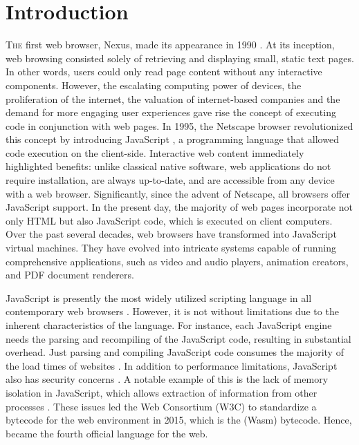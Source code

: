 
\chapter{Introduction}
\label{Intro}


\lettrine[lines=3]{T}{he} first web browser, Nexus, made its appearance in 1990 \cite{nexus}.  
At its inception, web browsing consisted solely of retrieving and displaying small, static text pages. 
In other words, users could only read page content without any interactive components. 
However, the escalating computing power of devices, the proliferation of the internet, the valuation of internet-based companies and the demand for more engaging user experiences gave rise the concept of executing code in conjunction with web pages. 
In 1995, the Netscape browser revolutionized this concept by introducing JavaScript \cite{10.1007/978-3-642-14107-2_7}, a programming language that allowed code execution on the client-side.
Interactive web content immediately highlighted benefits: unlike classical native software, web applications do not require installation, are always up-to-date, and are accessible from any device with a web browser. 
Significantly, since the advent of Netscape, all browsers offer JavaScript support. 
In the present day, the majority of web pages incorporate not only HTML but also JavaScript code, which is executed on client computers. 
Over the past several decades, web browsers have transformed into JavaScript virtual machines. 
They have evolved into intricate systems capable of running comprehensive applications, such as video and audio players, animation creators, and PDF document renderers.

JavaScript is presently the most widely utilized scripting language in all contemporary web browsers \cite{mulazzani2013fast}.
However, it is not without limitations due to the inherent characteristics of the language.
For instance, each JavaScript engine needs the parsing and recompiling of the JavaScript code, resulting in substantial overhead.
Just parsing and compiling JavaScript code consumes the majority of the load times of websites \cite{clark}.
In addition to performance limitations, JavaScript also has security concerns \cite{10.1145/1190216.1190252}.
A notable example of this is the lack of memory isolation in JavaScript, which allows extraction of information from other processes \cite{10.1145/3412841.3442001}.
These issues led the Web Consortium (W3C) to standardize a bytecode for the web environment in 2015, which is the \Wasm(Wasm) bytecode.
Hence, \Wasm became the fourth official language for the web.


